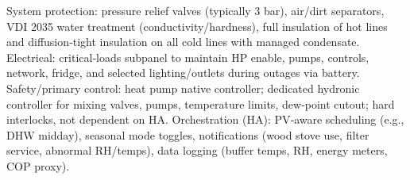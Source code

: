 \markdownRendererUlItem System protection: pressure relief valves (typically 3 bar), air/dirt separators, VDI 2035 water treatment (conductivity/hardness), full insulation of hot lines and diffusion‑tight insulation on all cold lines with managed condensate.\markdownRendererUlItemEnd 
\markdownRendererUlItem Electrical: critical‑loads subpanel to maintain HP enable, pumps, controls, network, fridge, and selected lighting/outlets during outages via battery.\markdownRendererUlItemEnd 
\markdownRendererUlEndTight \markdownRendererInterblockSeparator
{}
\markdownRendererSectionEnd \markdownRendererSectionBegin
{}\markdownRendererInterblockSeparator
{}\markdownRendererUlBeginTight
\markdownRendererUlItem Safety/primary control: heat pump native controller; dedicated hydronic controller for mixing valves, pumps, temperature limits, dew‑point cutout; hard interlocks, not dependent on HA.\markdownRendererUlItemEnd 
\markdownRendererUlItem Orchestration (HA): PV‑aware scheduling (e.g., DHW midday), seasonal mode toggles, notifications (wood stove use, filter service, abnormal RH/temps), data logging (buffer temps, RH, energy meters, COP proxy).\markdownRendererUlItemEnd 
\markdownRendererUlEndTight 
\markdownRendererSectionEnd 
\markdownRendererSectionEnd \markdownRendererDocumentEnd